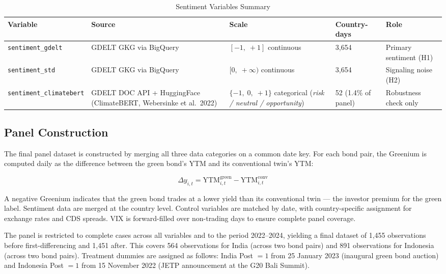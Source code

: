 \documentclass[12pt,a4paper]{article}
\begin{document}
\begin{table}[H]
\caption{Sentiment Variables Summary}
\label{tab:sentiment}
\centering
\small
{}
\begin{tabular}{L{3.2cm} L{3.8cm} L{2.2cm} C{1.8cm} L{2.6cm}}
\toprule
{}
\textbf{Variable} & \textbf{Source} & \textbf{Scale} & \textbf{Country-days} & \textbf{Role} \\
\midrule
\texttt{sentiment\_gdelt}
  & GDELT GKG via BigQuery
  & $[-1,\; +1]$ continuous
  & 3,654
  & Primary sentiment (H1) \\
\texttt{sentiment\_std}
  & GDELT GKG via BigQuery
  & $[0,\; +\infty)$ continuous
  & 3,654
  & Signaling noise (H2) \\
\texttt{sentiment\_climatebert}
  & GDELT DOC API + HuggingFace (ClimateBERT, Webersinke et al.\ 2022)
  & $\{-1,\; 0,\; +1\}$ categorical (\textit{risk / neutral / opportunity})
  & 52 (1.4\% of panel)
  & Robustness check only \\
\bottomrule
\end{tabular}
\end{table}

\subsection{Panel Construction}

The final panel dataset is constructed by merging all three data categories on a common date key. For each bond pair, the Greenium is computed daily as the difference between the green bond's YTM and its conventional twin's YTM:

\begin{equation}
\Delta y_{i,t} = \text{YTM}^{\text{green}}_{i,t} - \text{YTM}^{\text{conv}}_{i,t}
\end{equation}

A negative Greenium indicates that the green bond trades at a lower yield than its conventional twin --- the investor premium for the green label. Sentiment data are merged at the country level. Control variables are matched by date, with country-specific assignment for exchange rates and CDS spreads. VIX is forward-filled over non-trading days to ensure complete panel coverage.

The panel is restricted to complete cases across all variables and to the period 2022--2024, yielding a final dataset of 1,455 observations before first-differencing and 1,451 after. This covers 564 observations for India (across two bond pairs) and 891 observations for Indonesia (across two bond pairs). Treatment dummies are assigned as follows: India Post $= 1$ from 25 January 2023 (inaugural green bond auction) and Indonesia Post $= 1$ from 15 November 2022 (JETP announcement at the G20 Bali Summit).
\end{document}

